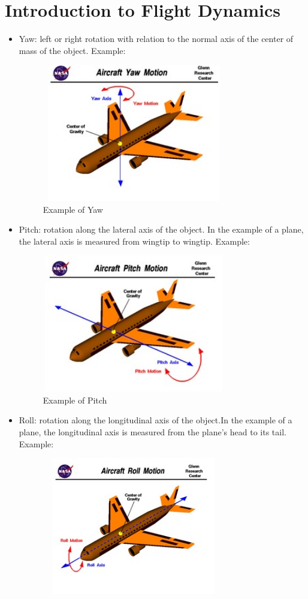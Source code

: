 \documentclass[letterpaper,english, 12pt]{article}
\begin{document}
\section*{Introduction to Flight Dynamics}
\begin{itemize}
		\item Yaw: left or right rotation with relation to the normal axis of the center of mass  of the object. Example: \\
		\begin{figure}[H]
			\centering
			\includegraphics[height=6cm, width=80mm]{pics/yaw1.jpg} 
			\caption{Example of Yaw}
		\end{figure}
		\item Pitch: rotation along the lateral axis of the object. In the example of a plane, the lateral axis is measured from wingtip to wingtip. Example:
		\begin{figure}[H]
			\centering
			\includegraphics[height=6cm, width=80mm]{pics/pitch1.jpg} 
			\caption{Example of Pitch}
		\end{figure}
		\item Roll: rotation along the longitudinal axis of the object.In the example of a plane, the longitudinal axis is measured from the plane's head to its tail. Example:
		\begin{figure}[H]
			\centering
			\includegraphics[height=6cm, width=80mm]{pics/roll1.jpg} 

\end{figure}
\end{itemize}
\end{document}
